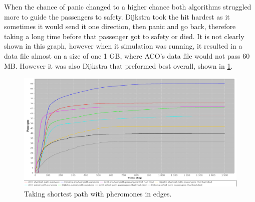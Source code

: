 When the chance of panic changed to a higher chance both algorithms struggled more to guide the passengers to safety. Dijkstra took the hit hardest as it sometimes it would send it one direction, then panic and go back, therefore taking a long time before that passenger got to safety or died. It is not clearly shown in this graph, however when it simulation was running, it resulted in a data file almost on a size of one 1 GB, where ACO's data file would not pass 60 MB. However it was also Dijkstra that preformed best overall, shown in \ref{fig:celebHPanic}.

\begin{figure} [h]
\centering
\hspace*{-1.0in}
\includegraphics[scale=0.35]{images/Graph-using-200-rounds-140-passangers-and-one-fire-high-panic.png}
\caption{Taking shortest path with pheromones in edges.}
\label{fig:celebHPanic}
\end{figure}
